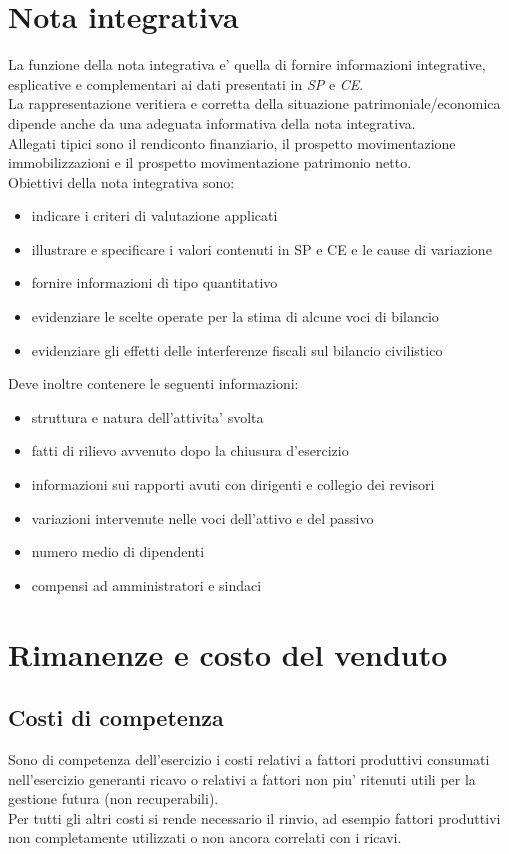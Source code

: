 \documentclass{report}
\begin{document}
	\section{Nota integrativa}
	La funzione della nota integrativa e' quella di fornire informazioni integrative, esplicative e complementari ai dati presentati in \textit{SP} e \textit{CE}.\medskip \\La rappresentazione veritiera e corretta della situazione patrimoniale/economica dipende anche da una adeguata informativa della nota integrativa.\medskip \\Allegati tipici sono il rendiconto finanziario, il prospetto movimentazione immobilizzazioni e il prospetto movimentazione patrimonio netto.\medskip \\Obiettivi della nota integrativa sono:
	\begin{itemize}
		\item indicare i criteri di valutazione applicati
		\item illustrare e specificare i valori contenuti in SP e CE e le cause di variazione
		\item fornire informazioni di tipo quantitativo
		\item evidenziare le scelte operate per la stima di alcune voci di bilancio
		\item evidenziare gli effetti delle interferenze fiscali sul bilancio civilistico
	\end{itemize}
	Deve inoltre contenere le seguenti informazioni:
	\begin{itemize}
		\item struttura e natura dell'attivita' svolta
		\item fatti di rilievo avvenuto dopo la chiusura d'esercizio
		\item informazioni sui rapporti avuti con dirigenti e collegio dei revisori
		\item variazioni intervenute nelle voci dell'attivo e del passivo
		\item numero medio di dipendenti
		\item compensi ad amministratori e sindaci
	\end{itemize}
	\section{Rimanenze e costo del venduto}
	\subsection{Costi di competenza}
	Sono di competenza dell'esercizio i costi relativi a fattori produttivi consumati nell'esercizio generanti ricavo o relativi a fattori non piu' ritenuti utili per la gestione futura (non recuperabili).
	\medskip \\Per tutti gli altri costi si rende necessario il rinvio, ad esempio fattori produttivi non completamente utilizzati o non ancora correlati con i ricavi.
\end{document}
